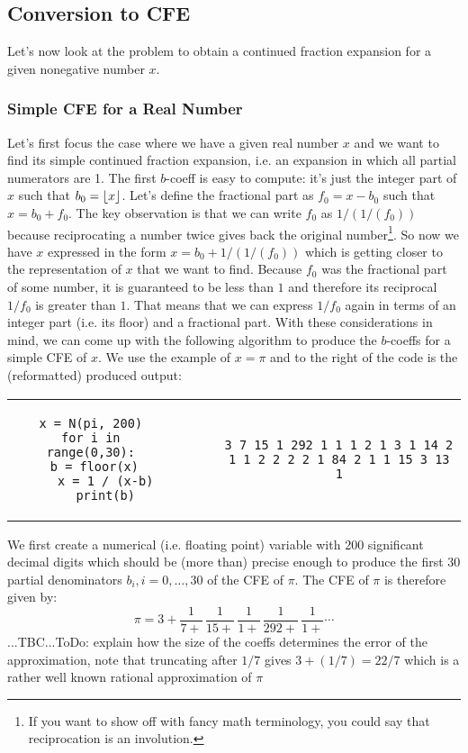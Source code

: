 




\subsection{Conversion to CFE}
Let's now look at the problem to obtain a continued fraction expansion for a given nonegative number $x$.

\subsubsection{Simple CFE for a Real Number}
Let's first focus the case where we have a given real number $x$ and we want to find its simple continued fraction expansion, i.e. an expansion in which all partial numerators are 1. The first $b$-coeff is easy to compute: it's just the integer part of $x$ such that $b_0 = \lfloor x\rfloor$. Let's define the fractional part as $f_0 = x - b_0$ such that $x = b_0 + f_0$. The key observation is that we can write $f_0$ as $1/(1/(f_0))$ because reciprocating a number twice gives back the original number\footnote{If you want to show off with fancy math terminology, you could say that reciprocation is an involution.}. So now we have $x$ expressed in the form $x = b_0 + 1/(1/(f_0))$ which is getting closer to the representation of $x$ that we want to find. Because $f_0$ was the fractional part of some number, it is guaranteed to be less than $1$ and therefore its reciprocal $1/f_0$ is greater than $1$. That means that we can express $1/f_0$ again in terms of an integer part (i.e. its floor) and a fractional part. With these considerations in mind, we can come up with the following algorithm to produce the $b$-coeffs for a simple CFE of $x$. We use the example of $x = \pi$ and to the right of the code is the (reformatted) produced output:
\begin{center}
\begin{tabular}{ ccccc } 
\begin{lstlisting}
x = N(pi, 200)
for i in range(0,30):
    b = floor(x)   
    x = 1 / (x-b)
    print(b)
\end{lstlisting}
& & \vline & &
\begin{lstlisting}
3 7 15 1 292 1 1 1 2 1 3 1 14 2 
1 1 2 2 2 2 1 84 2 1 1 15 3 13 1
\end{lstlisting}
\end{tabular}
\end{center}
We first create a numerical (i.e. floating point) variable with 200 significant decimal digits which should be (more than) precise enough to produce the first 30 partial denominators $b_i, i = 0,\ldots,30$ of the CFE of $\pi$. The CFE of $\pi$ is therefore given by:
\begin{equation}
\pi = 3 + \frac{1}{7 +} \, \frac{1}{15+} \, \frac{1}{1 +} \, \frac{1}{292 +} \, \frac{1}{1 +} \cdots
\end{equation}
...TBC...ToDo: explain how the size of the coeffs determines the error of the approximation, note that truncating after $1/7$ gives $3 + (1/7) = 22/7$ which is a rather well known rational approximation of $\pi$

